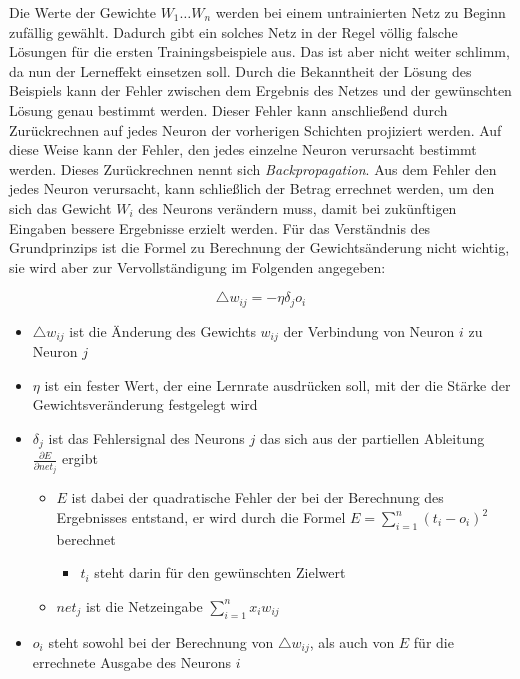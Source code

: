 Die Werte der Gewichte \(W_1 \dots W_n\) werden bei einem untrainierten Netz zu Beginn zufällig gewählt. Dadurch gibt ein solches Netz in der Regel völlig falsche Lösungen für die ersten Trainingsbeispiele aus. Das ist aber nicht weiter schlimm, da nun der Lerneffekt einsetzen soll. Durch die Bekanntheit der Lösung des Beispiels kann der Fehler zwischen dem Ergebnis des Netzes und der gewünschten Lösung genau bestimmt werden. Dieser Fehler kann anschließend durch Zurückrechnen auf jedes Neuron der vorherigen Schichten projiziert werden. Auf diese Weise kann der Fehler, den jedes einzelne Neuron verursacht bestimmt werden. Dieses Zurückrechnen nennt sich \textit{Backpropagation}. Aus dem Fehler den jedes Neuron verursacht, kann schließlich der Betrag errechnet werden, um den sich das Gewicht \(W_i\) des Neurons verändern muss, damit bei zukünftigen Eingaben bessere Ergebnisse erzielt werden. Für das Verständnis des Grundprinzips ist die Formel zu Berechnung der Gewichtsänderung nicht wichtig, sie wird aber zur Vervollständigung im Folgenden angegeben: 

\begin{equation}
\triangle w_{ij} = -\eta\delta_jo_i
\label{eq:BackProb}
\end{equation}

\begin{itemize}
\item \(\triangle w_{ij}\) ist die Änderung des Gewichts \(w_{ij}\) der Verbindung von Neuron \(i\) zu Neuron \(j\)
\item \(\eta\)  ist ein fester Wert, der eine Lernrate ausdrücken soll, mit der die Stärke der Gewichtsveränderung festgelegt wird
\item \(\delta_j\) ist das Fehlersignal des Neurons \(j\) das sich aus der partiellen Ableitung \(\frac{\partial E}{\partial net_j}\) ergibt\\
\begin{itemize}
\item \(E\) ist dabei der quadratische Fehler der bei der Berechnung des Ergebnisses entstand, er wird durch die Formel \(E = \sum \limits_{i=1}^n (t_i - o_i)^2\) berechnet
\begin{itemize}
\item \(t_i\) steht darin für den gewünschten Zielwert
\end{itemize}
\item \(net_j\) ist die Netzeingabe \(\sum \limits_{i=1}^n x_iw_{ij}\)
\end{itemize}

\item \(o_i\) steht sowohl bei der Berechnung von \(\triangle w_{ij}\), als auch von \(E\) für die errechnete Ausgabe des Neurons \(i\)
\end{itemize}

